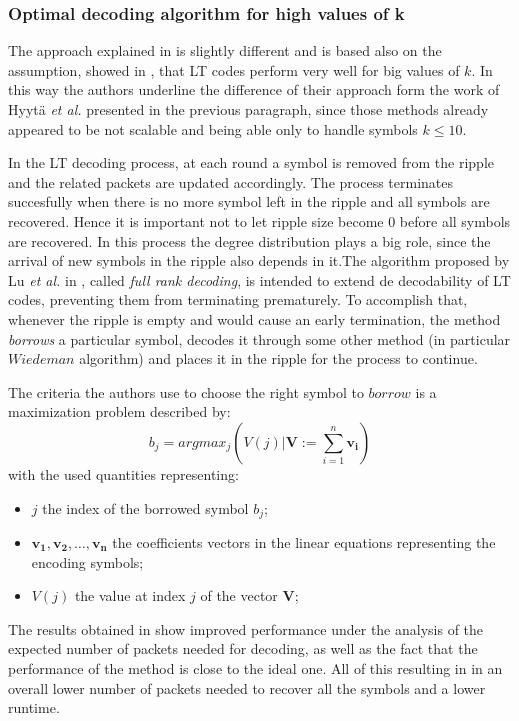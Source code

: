 \subsubsection{Optimal decoding algorithm for high values of k}
The approach explained in \cite{Lu} is slightly different and is based also on the assumption, showed in \cite{Shokrollahi2006}, that LT codes perform very well for big values of $k$. In this way the authors underline the difference of their approach form the work of Hyyt\"a \textit{et al.} presented in the previous paragraph, since those methods already appeared to be not scalable and being able only to handle symbols $k \leq 10$.

In the LT decoding process, at each round a symbol is removed from the ripple and the related packets are updated accordingly. The process terminates succesfully when there is no more symbol left in the ripple and all symbols are recovered. Hence it is important not to let ripple size become 0 before all symbols are recovered. In this process the degree distribution plays a big role, since the arrival of new symbols in the ripple also depends in it.The algorithm proposed by Lu \textit{et al.} in \cite{Lu}, called \textit{full rank decoding}, is intended to extend de decodability of LT codes, preventing them from terminating prematurely. To accomplish that, whenever the ripple is empty and would cause an early termination, the method \textit{borrows} a particular symbol, decodes it through some other method (in particular $Wiedeman$ algorithm) and places it in the ripple for the process to continue.

The criteria the authors use to choose the right symbol to $borrow$ is a maximization problem described by:
\begin{equation}
  b_j = argmax_j (V(j)|\mathbf{V} := \sum_{i=1}^{n}\mathbf{v_i})
\end{equation}
with the used quantities representing:
\begin{itemize}
  \item $j$ the index of the borrowed symbol $b_j$;
  \item $\mathbf{v_1},\mathbf{v_2},\dots,\mathbf{v_n}$ the coefficients vectors in the linear equations representing the encoding symbols;
  \item $V(j)$ the value at index $j$ of the vector $\mathbf{V}$;
\end{itemize}

The results obtained in \cite{Lu} show improved performance under the analysis of the expected number of packets needed for decoding, as well as the fact that the performance of the method is close to the ideal one. All of this resulting in in an overall lower number of packets needed to recover all the symbols and a lower runtime.
